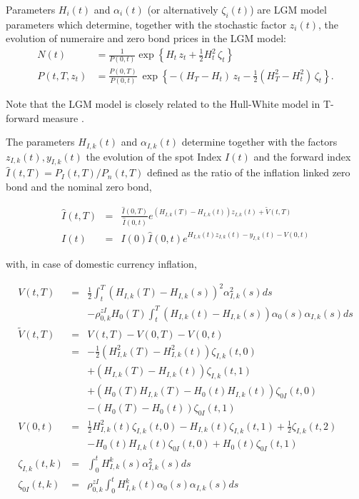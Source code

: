\documentclass[12pt, a4paper]{article}
\begin{document}
{{\begin{appendix}
\medskip Parameters $H_i(t)$ and $\alpha_i(t)$ (or alternatively $\zeta_i(t)$) are LGM model parameters which determine,
together with the stochastic factor $z_i(t)$, the evolution of numeraire and zero bond prices in the LGM model:
\begin{align}
N(t) &= \frac{1}{P(0,t)}\exp\left\{H_t\, z_t + \frac{1}{2}H^2_t\,\zeta_t \right\}
\label{lgm1f_numeraire} \\
P(t,T,z_t)
&= \frac{P(0,T)}{P(0,t)}\:\exp\left\{ -(H_T-H_t)\,z_t - \frac{1}{2} \left(H^2_T-H^2_t\right)\,\zeta_t\right\}.
\label{lgm1f_zerobond}
\end{align}

Note that the LGM model is closely related to the Hull-White model in T-forward measure \cite{Lichters}.

\medskip The parameters $H_{I,k}(t)$ and $\alpha_{I,k}(t)$ determine together with the factors $z_{I,k}(t), y_{I,k}(t)$
the evolution of the spot Index $I(t)$ and the forward index $\hat{I}(t,T) = P_I(t,T) / P_n(t,T)$ defined as the ratio
of the inflation linked zero bond and the nominal zero bond,

\begin{eqnarray*}
  \hat{I}(t,T) &=& \frac{\hat{I}(0,T)}{\hat{I}(0,t)} e^{(H_{I,k}(T)-H_{I,k}(t))z_{I,k}(t)+\tilde{V}(t,T)} \\
  I(t) &=& I(0) \hat{I}(0,t)e^{H_{I,k}(t)z_{I,k}(t)-y_{I,k}(t)-V(0,t)}
\end{eqnarray*}

with, in case of domestic currency inflation,

\begin{eqnarray*}
  V(t,T) &=& \frac{1}{2} \int_t^T (H_{I,k}(T)-H_{I,k}(s))^2 \alpha_{I,k}^2(s) ds \\
         & & - \rho^{zI}_{0,k} H_0(T) \int_t^T (H_{I,k}(t)-H_{I,k}(s))\alpha_0(s)\alpha_{I,k}(s)ds \\
  \tilde{V}(t,T) &=& V(t,T) - V(0,T) -V(0,t) \\
         &=& -\frac{1}{2}(H_{I,k}^2(T)-H_{I,k}^2(t))\zeta_{I,k}(t,0) \\
         & & +(H_{I,k}(T)-H_{I,k}(t)) \zeta_{I,k}(t,1) \\
         & & +(H_0(T)H_{I,k}(T) - H_0(t)H_{I,k}(t))\zeta_{0I}(t,0) \\
         & & -(H_0(T)-H_0(t))\zeta_{0I}(t,1) \\
  V(0,t) &=& \frac{1}{2}H_{I,k}^2(t)\zeta_{I,k}(t,0)-H_{I,k}(t)\zeta_{I,k}(t,1)+\frac{1}{2}\zeta_{I,k}(t,2) \\
         & & -H_0(t)H_{I,k}(t)\zeta_{0I}(t,0)+H_0(t)\zeta_{0I}(t,1) \\
  \zeta_{I,k}(t,k) &=& \int_0^t H_{I,k}^k(s)\alpha_{I,k}^2(s) ds \\
  \zeta_{0I}(t,k) &=& \rho^{zI}_{0,k}\int_0^t H_{I,k}^k(t) \alpha_0(s) \alpha_{I,k}(s) ds
\end{eqnarray*}


\end{appendix}}}
\end{document}
